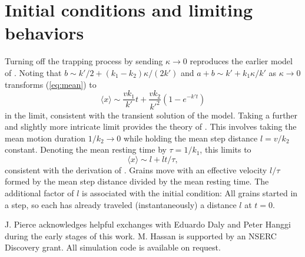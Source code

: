 \documentclass[]{agujournal2018}
\newcommand\be{\begin{equation}}
\newcommand\ee{\end{equation}}
\newcommand\bra{\langle}
\newcommand\ket{\rangle}
\begin{document}
\section{Initial conditions and limiting behaviors}
\label{sec:appendixC}
Turning off the trapping process by sending $\kappa \rightarrow 0 $ reproduces the earlier model of \citet{Lisle1998}. 
Noting that $b \sim k'/2 + (k_1-k_2)\kappa/(2k')$ and $a+b \sim k' + k_1\kappa/k'$ as $\kappa \rightarrow 0$ transforms (\ref{eq:mean}) to 
\be \bra x \ket \sim  \frac{vk_1}{k'}t + \frac{vk_2}{k'^2}(1-e^{-k't})\ee
in the limit, consistent with the transient solution of the \citet{Lisle1998} model.
Taking a further and slightly more intricate limit provides the theory of \citet{Einstein1937}. This involves taking the mean motion duration $1/k_2 \rightarrow 0$ while holding the mean step distance $l=v/k_2$ constant.
Denoting the mean resting time by $\tau=1/k_1$, this limits to
\be \bra x \ket \sim l + lt/\tau,\ee
consistent with the derivation of \citet{Einstein1937}.
Grains move with an effective velocity $l/\tau$ formed by the mean step distance divided by the mean resting time.
The additional factor of $l$ is associated with the initial condition: All grains started in a step, so each has already traveled (instantaneously) a distance $l$ at $t=0$.


\acknowledgments
J. Pierce acknowledges helpful exchanges with Eduardo Daly and Peter Hanggi during the early stages of this work. M. Hassan is supported by an NSERC Discovery grant. All simulation code is available on request.


\end{document}
